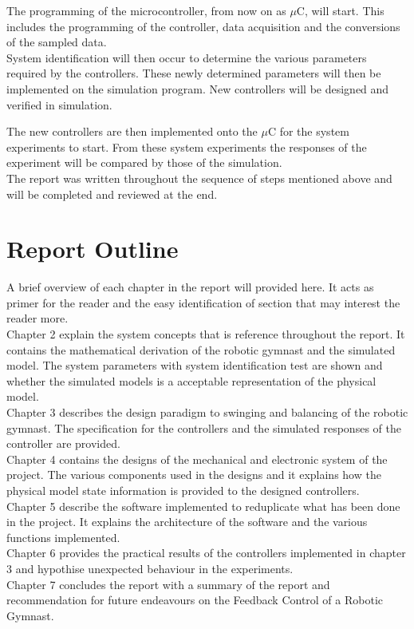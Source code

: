 The programming of the microcontroller, from now on as $\mu$C, will start. This includes the programming of the controller, data acquisition and the conversions of the sampled data.\\

System identification will then occur to determine the various parameters required by the controllers. These newly determined parameters will then be implemented on the simulation program. New controllers will be designed and verified in simulation.

The new controllers are then implemented onto the $\mu$C for the system experiments to start. From these system experiments the responses of the experiment will be compared by those of the simulation.\\

The report was written throughout the sequence of steps mentioned above and will be completed and reviewed at the end.


\section{Report Outline}

A brief overview of each chapter in the report will provided here. It acts as primer for the reader and the easy identification of section that may interest the reader more.\\

Chapter 2 explain the system concepts that is reference throughout the report. It contains the mathematical derivation of the robotic gymnast and the simulated model. The system parameters with system identification test are shown and whether the simulated models is a acceptable representation of the physical model.\\

Chapter 3 describes the design paradigm to swinging and balancing of the robotic gymnast. The specification for the controllers and the simulated responses of the controller are provided.\\

Chapter 4 contains the designs of the mechanical and electronic system of the project. The various components used in the designs and it explains how the physical model state information is provided to the designed controllers.\\

Chapter 5 describe the software implemented to reduplicate what has been done in the project.  It explains the architecture of the software and the various functions implemented.\\

Chapter 6 provides the practical results of the controllers implemented in chapter 3 and hypothise unexpected behaviour in the experiments.\\

Chapter 7 concludes the report with a summary of the report and recommendation for future endeavours on the Feedback Control of a Robotic Gymnast. 

 
